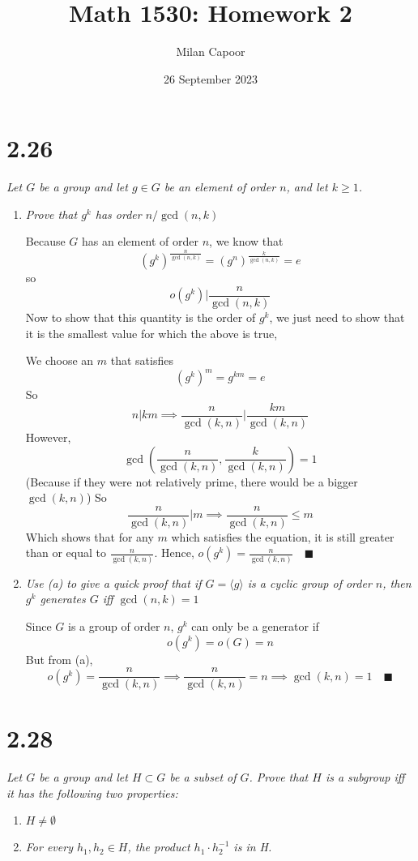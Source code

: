 \documentclass[12pt]{article}
\title{Math 1530: Homework 2}
\author{Milan Capoor}
\date{26 September 2023}
\newcommand{\qed}{\quad \blacksquare}
\newcommand{\brak}[1]{\langle #1 \rangle}
\begin{document}
\maketitle
\section*{2.26}
\emph{Let $G$ be a group and let $g\in G$ be an element of order $n$, and let $k \geq 1$.} 

\begin{enumerate}[label=(\alph*)]
    \item \emph{Prove that $g^k$ has order $n/\gcd(n, k)$}

    \color{blue}
        Because $G$ has an element of order $n$, we know that 
        \[(g^k)^{\frac{n}{\gcd(n, k)}} = (g^n)^{\frac{k}{\gcd(n, k)}} = e\]
        so 
        \[o(g^k) \bigg\vert \frac{n}{\gcd(n, k)}\]
        Now to show that this quantity is the order of $g^k$, we just need to show that it is the smallest value for which the above is true, 

        We choose an $m$ that satisfies
        \[(g^k)^{m} = g^{km} = e\]
        So 
        \[n | km \implies \frac{n}{\gcd(k, n)} \bigg\vert \frac{km}{\gcd(k, n)}\]
        However, 
        \[\gcd\left(\frac{n}{\gcd(k, n)}, \frac{k}{\gcd(k, n)}\right) = 1\]
        (Because if they were not relatively prime, there would be a bigger $\gcd(k, n)$)
        So
        \[\frac{n}{\gcd(k,n)} \bigg \vert m \implies \frac{n}{\gcd(k,n)} \leq m\]
        Which shows that for any $m$ which satisfies the equation, it is still greater than or equal to $\frac{n}{\gcd(k,n)}$. Hence, $o(g^k) = \frac{n}{\gcd(k,n)} \qed$

    \color{black}

    \item \emph{Use (a) to give a quick proof that if $G = \brak{g}$ is a cyclic group of order $n$, then $g^k$ generates $G$ iff $\gcd(n,k)= 1$}
    
    \color{blue}
        Since $G$ is a group of order $n$, $g^k$ can only be a generator if
        \[o(g^k) = o(G) = n\]
        But from (a), 
        \[o(g^k) = \frac{n}{\gcd(k,n)} \implies \frac{n}{\gcd(k,n)} = n \implies \gcd(k,n) = 1 \qed\]
    \color{black}
\end{enumerate}
\pagebreak 

\section*{2.28}
\emph{Let $G$ be a group and let $H \subset G$ be a subset of $G$. Prove that $H$ is a subgroup iff it has the following two properties:}
\begin{enumerate}
    \item $H \neq \emptyset$
    \item \emph{For every $h_1, h_2 \in H$, the product $h_1 \cdot h_2^{-1}$ is in H.}
\end{enumerate}
\end{document}
